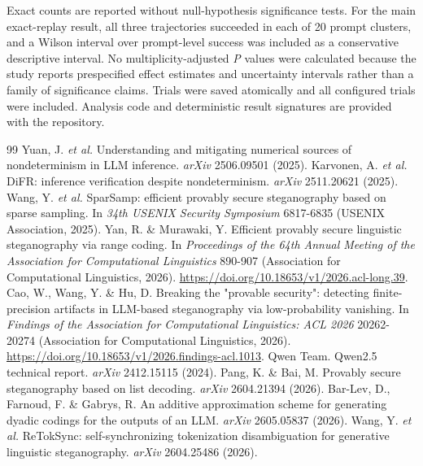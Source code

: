\documentclass{nature}
\begin{document}
\begin{methods}
Exact counts are reported without null-hypothesis significance tests. For the main exact-replay result, all three trajectories succeeded in each of 20 prompt clusters, and a Wilson interval over prompt-level success was included as a conservative descriptive interval. No multiplicity-adjusted \textit{P} values were calculated because the study reports prespecified effect estimates and uncertainty intervals rather than a family of significance claims. Trials were saved atomically and all configured trials were included. Analysis code and deterministic result signatures are provided with the repository.

\end{methods}

\begin{thebibliography}{99}
 Yuan, J. \textit{et al.} Understanding and mitigating numerical sources of nondeterminism in LLM inference. \textit{arXiv} 2506.09501 (2025).
 Karvonen, A. \textit{et al.} DiFR: inference verification despite nondeterminism. \textit{arXiv} 2511.20621 (2025).
 Wang, Y. \textit{et al.} SparSamp: efficient provably secure steganography based on sparse sampling. In \textit{34th USENIX Security Symposium} 6817-6835 (USENIX Association, 2025).
 Yan, R. \& Murawaki, Y. Efficient provably secure linguistic steganography via range coding. In \textit{Proceedings of the 64th Annual Meeting of the Association for Computational Linguistics} 890-907 (Association for Computational Linguistics, 2026). \url{https://doi.org/10.18653/v1/2026.acl-long.39}.
 Cao, W., Wang, Y. \& Hu, D. Breaking the "provable security": detecting finite-precision artifacts in LLM-based steganography via low-probability vanishing. In \textit{Findings of the Association for Computational Linguistics: ACL 2026} 20262-20274 (Association for Computational Linguistics, 2026). \url{https://doi.org/10.18653/v1/2026.findings-acl.1013}.
 Qwen Team. Qwen2.5 technical report. \textit{arXiv} 2412.15115 (2024).
 Pang, K. \& Bai, M. Provably secure steganography based on list decoding. \textit{arXiv} 2604.21394 (2026).
 Bar-Lev, D., Farnoud, F. \& Gabrys, R. An additive approximation scheme for generating dyadic codings for the outputs of an LLM. \textit{arXiv} 2605.05837 (2026).
 Wang, Y. \textit{et al.} ReTokSync: self-synchronizing tokenization disambiguation for generative linguistic steganography. \textit{arXiv} 2604.25486 (2026).
\end{thebibliography}
\end{document}
